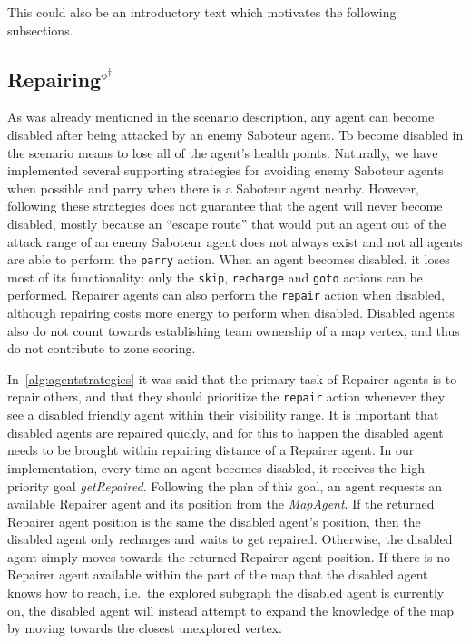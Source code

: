 This could also be an introductory text which motivates the following subsections.





\subsection[Repairing]{Repairing$^\diamond^\dagger$}\label{alg:repairing}
As was already mentioned in the scenario description, any agent can become disabled after being attacked by an enemy Saboteur agent.
To become disabled in the scenario means to lose all of the agent's health points.
Naturally, we have implemented several supporting strategies for avoiding enemy Saboteur agents when possible and parry when there is a Saboteur agent nearby.
However, following these strategies does not guarantee that the agent will never become disabled, mostly because an \enquote{escape route} that would put an agent out of the attack range of an enemy Saboteur agent does not always exist and not all agents are able to perform the \texttt{parry} action.
When an agent becomes disabled, it loses most of its functionality: only the \texttt{skip}, \texttt{recharge} and \texttt{goto} actions can be performed.
Repairer agents can also perform the \texttt{repair} action when disabled, although repairing costs more energy to perform when disabled.
Disabled agents also do not count towards establishing team ownership of a map vertex, and thus do not contribute to zone scoring.

In~\autoref{alg:agentstrategies} it was said that the primary task of Repairer agents is to repair others, and that they should prioritize the \texttt{repair} action whenever they see a disabled friendly agent within their visibility range.
It is important that disabled agents are repaired quickly, and for this to happen the disabled agent needs to be brought within repairing distance of a Repairer agent.
In our implementation, every time an agent becomes disabled, it receives the high priority goal \emph{getRepaired}.
Following the plan of this goal, an agent requests an available Repairer agent and its position from the \emph{MapAgent}.
If the returned Repairer agent position is the same the disabled agent's position, then the disabled agent only recharges and waits to get repaired.
Otherwise, the disabled agent simply moves towards the returned Repairer agent position.
If there is no Repairer agent available within the part of the map that the disabled agent knows how to reach, i.e.\ the explored subgraph the disabled agent is currently on, the disabled agent will instead attempt to expand the knowledge of the map by moving towards the closest unexplored vertex.

